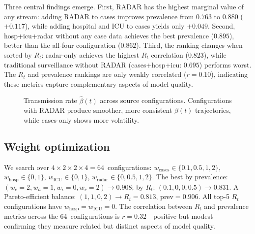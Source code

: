 \documentclass[11pt]{article}
\begin{document}
Three central findings emerge. First, RADAR has the highest marginal value of any stream: adding RADAR to cases improves prevalence from $0.763$ to $0.880$ ($+0.117$), while adding hospital and ICU to cases yields only $+0.049$. Second, hosp+icu+radar without any case data achieves the best prevalence ($0.895$), better than the all-four configuration ($0.862$). Third, the ranking changes when sorted by $R_t$: radar-only achieves the highest $R_t$ correlation ($0.823$), while traditional surveillance without RADAR (cases+hosp+icu: $0.695$) performs worst. The $R_t$ and prevalence rankings are only weakly correlated ($r=0.10$), indicating these metrics capture complementary aspects of model quality.

\begin{figure}[ht]
\centering
{}
\caption{Transmission rate $\hat\beta(t)$ across source configurations. Configurations with RADAR produce smoother, more consistent $\beta(t)$ trajectories, while cases-only shows more volatility.}\label{fig:beta-ablation}
\end{figure}

\subsection{Weight optimization}\label{sec:results:weights}

We search over $4\times 2\times 2\times 4=64$~configurations: $w_{\mathrm{cases}}\in\{0.1,0.5,1,2\}$, $w_{\mathrm{hosp}}\in\{0,1\}$, $w_{\mathrm{ICU}}\in\{0,1\}$, $w_{\mathrm{radar}}\in\{0,0.5,1,2\}$. The best by prevalence: $(w_c{=}2,w_h{=}1,w_i{=}0,w_r{=}2)\to 0.908$; by $R_t$: $(0.1,0,0,0.5)\to 0.831$. A Pareto-efficient balance: $(1,1,0,2)\to R_t{=}0.813$, prev$=0.906$. All top-5 $R_t$ configurations have $w_{\mathrm{hosp}}=w_{\mathrm{ICU}}=0$. The correlation between $R_t$ and prevalence metrics across the 64~configurations is $r=0.32$---positive but modest---confirming they measure related but distinct aspects of model quality.
\end{document}
